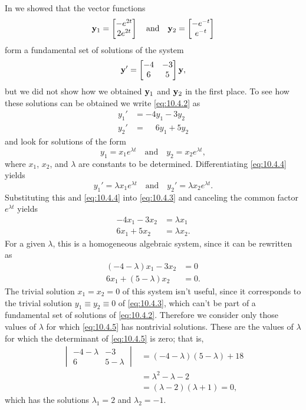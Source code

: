 In  we showed that the vector
functions
\[
\mathbf{y}_1=\begin{bmatrix}-e^{2t}\\2e^{2t}\end{bmatrix}\quad\text{and}\quad 
\mathbf{y}_2=\begin{bmatrix}-e^{-t}\\e^{-t}\end{bmatrix}
\]
form a fundamental set of solutions of the system
\begin{equation}\label{eq:10.4.2}
\mathbf{y}'=\begin{bmatrix}-4&-3\\6&5\end{bmatrix} \mathbf{y},
\end{equation}
but we did not show how we obtained $\mathbf{y}_1$ and $\mathbf{y}_2$ in the
first place. To see how these solutions can be obtained we write
\eqref{eq:10.4.2} as
\begin{equation}\label{eq:10.4.3}
\begin{aligned}
y_1'&=-4y_1-3y_2\\y_2'&=\phantom{-}6y_1+5y_2
\end{aligned}
\end{equation}
and look for solutions of the form
\begin{equation}\label{eq:10.4.4}
y_1=x_1e^{\lambda t}\quad\text{and}\quad y_2=x_2e^{\lambda t},
\end{equation}
where $x_1$, $x_2$, and $\lambda$ are constants to be determined.
 Differentiating  \eqref{eq:10.4.4} yields
\[
y_1'=\lambda x_1e^{\lambda
t}\quad\text{and}\quad y_2'=\lambda x_2e^{\lambda t}.
\]
Substituting this and  \eqref{eq:10.4.4} into  \eqref{eq:10.4.3} and canceling
the common factor $e^{\lambda t}$ yields
\begin{align*}
-4x_1-3x_2&=\lambda x_1 \\
6 x_1+5x_2&=\lambda x_2.
\end{align*}
For a given $\lambda$, this is a homogeneous algebraic system, since it can
be rewritten as
\begin{equation}\label{eq:10.4.5}
\begin{aligned}
(-4-\lambda) x_1-3 x_2&=0\\
6 x_1+(5-\lambda) x_2&=0.
\end{aligned}
\end{equation}
The trivial solution $x_1=x_2=0$ of this system isn't  useful, since
it corresponds to the trivial solution $y_1\equiv y_2\equiv0$ of
\eqref{eq:10.4.3}, which can't be part of a fundamental set of solutions
of \eqref{eq:10.4.2}. Therefore we consider only those values of $\lambda$
for which \eqref{eq:10.4.5} has nontrivial solutions. These are the values
of $\lambda$ for which the determinant of \eqref{eq:10.4.5} is zero;   that
is,
\begin{align*}
\begin{vmatrix}-4-\lambda&-3\\6&5-\lambda\end{vmatrix}
&=(-4-\lambda)(5-\lambda)+18\\
&=\lambda^2-\lambda-2\\
&=(\lambda-2)(\lambda+1)=0,
\end{align*}
which has the solutions $\lambda_1=2$ and $\lambda_2=-1$.

